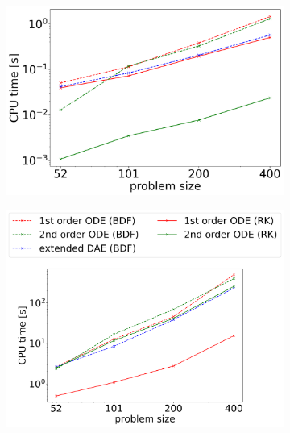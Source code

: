 \begin{figure}[H]
	\centering
	\begin{subfigure}[b]{0.32\textwidth}
		\centering
		\includegraphics[width=1\textwidth]{images/TANDEM_TimePerRHSEvaluation_differentSizes.png}
	\end{subfigure}
	\begin{subfigure}[b]{0.32\textwidth}
		\centering \hspace{-0.75cm}
		\includegraphics[width=1.18\textwidth]{images/TANDEM_CPU_Time_intialization.png}
	\end{subfigure}
	\begin{subfigure}[b]{0.32\textwidth}

\end{subfigure}
\end{figure}
